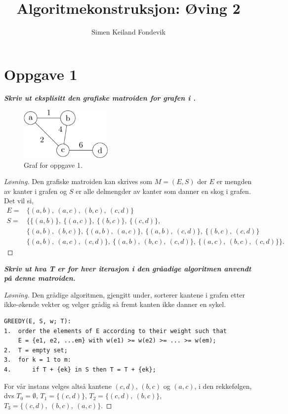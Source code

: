 \documentclass[12pt]{article}
\newenvironment{solution}{\begin{proof}[Løsning]}{\end{proof}}
\begin{document}
 
\title{Algoritmekonstruksjon: Øving 2}
\author{Simen Keiland Fondevik}

\maketitle

\section{Oppgave 1}
\it{\textbf{Skriv ut eksplisitt den grafiske matroiden for grafen i .}}
\begin{figure}[ht]
  \begin{center}
  	\includegraphics[width = 0.4\textwidth]{matroid.png}
    \caption{Graf for oppgave 1.}
    \label{matroid}
  \end{center}
\end{figure}

\begin{solution}
Den grafiske matroiden kan skrives som $M = (E, S)$ der $E$ er mengden av kanter i grafen og $S$ er alle delmengder av kanter som danner en skog i grafen. Det vil si,
\begin{align*}
E =& \{(a, b), ~(a, c), ~(b, c), ~(c, d)\} \\
S =& \{\{(a, b)\}, ~\{(a, c)\}, ~\{(b, c)\}, ~\{(c, d)\}, \\
   & \{(a, b), ~(b, c)\}, ~\{(a, b), ~(a, c)\}, ~\{(a, b), ~(c, d)\}, ~\{(b, c), ~(c, d)\} \\
   & \{(a, b), ~(a, c), ~(c, d)\}, ~\{(a, b), ~(b, c), ~(c, d) \}, ~\{(a, c), ~(b, c), ~(c, d)\} \}.
\end{align*}
\end{solution}

\it{\textbf{Skriv ut hva T er for hver iterasjon i den gråadige algoritmen anvendt på denne matroiden.}}
\begin{solution}
Den grådige algoritmen, gjengitt under, sorterer kantene i grafen etter ikke-økende vekter og velger grådig så fremt kanten ikke danner en sykel.
\begin{lstlisting}
GREEDY(E, S, w; T):
1.	order the elements of E according to their weight such that
	E = {e1, e2, ...em} with w(e1) >= w(e2) >= ... >= w(em);
2.	T = empty set;
3.	for k = 1 to m:
4.		if T + {ek} in S then T = T + {ek};
\end{lstlisting}
For vår instans velges altså kantene $(c, d)$, $(b, c)$ og $(a, c)$, i den rekkefølgen, dvs $T_0 = \emptyset$, $T_1 = \{(c, d)\}$, $T_2 = \{(c, d), ~(b, c)\}$, $T_3 = \{(c, d), ~(b, c), ~(a, c)\}$.
\end{solution}
\end{document}
